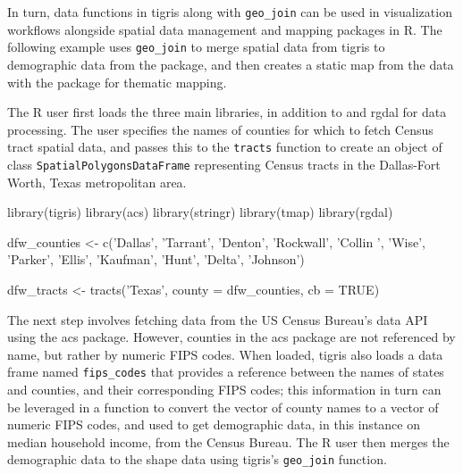 In turn, data functions in tigris along with \texttt{geo\_join} can be
used in visualization workflows alongside spatial data management and
mapping packages in R. The following example uses \texttt{geo\_join} to
merge spatial data from tigris to demographic data from the
 package, and then creates a static map from the data with
the  package for thematic mapping.

The R user first loads the three main libraries, in addition to
 and rgdal for data processing. The user specifies the
names of counties for which to fetch Census tract spatial data, and
passes this to the \texttt{tracts} function to create an object of class
\texttt{SpatialPolygonsDataFrame} representing Census tracts in the
Dallas-Fort Worth, Texas metropolitan area.

\begin{Schunk}
\begin{Sinput}
library(tigris)
library(acs)
library(stringr)
library(tmap)
library(rgdal)

dfw_counties <- c('Dallas', 'Tarrant', 'Denton', 'Rockwall', 'Collin ', 
                  'Wise', 'Parker', 'Ellis', 'Kaufman', 'Hunt', 'Delta', 'Johnson')

dfw_tracts <- tracts('Texas', county = dfw_counties, cb = TRUE)
\end{Sinput}
\end{Schunk}

The next step involves fetching data from the US Census Bureau's data
API using the acs package. However, counties in the acs package are not
referenced by name, but rather by numeric FIPS codes. When loaded,
tigris also loads a data frame named \texttt{fips\_codes} that provides
a reference between the names of states and counties, and their
corresponding FIPS codes; this information in turn can be leveraged in a
function to convert the vector of county names to a vector of numeric
FIPS codes, and used to get demographic data, in this instance on median
household income, from the Census Bureau. The R user then merges the
demographic data to the shape data using tigris's \texttt{geo\_join}
function.

